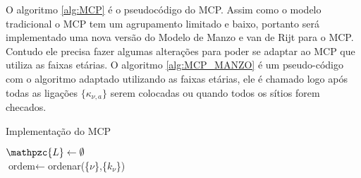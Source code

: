 O algoritmo \ref{alg:MCP} é o pseudocódigo do MCP. Assim como o modelo tradicional o MCP tem um agrupamento limitado e baixo, portanto será implementado uma nova versão do Modelo de 
Manzo e van de Rijt para o MCP. Contudo ele precisa fazer algumas alterações para poder se adaptar ao MCP que utiliza as faixas etárias. O algoritmo \ref{alg:MCP_MANZO} é um pseudo-código com o algoritmo adaptado utilizando as faixas etárias, ele é chamado logo após todas as ligações 
$\{\kappa_{\nu,a}\}$ serem colocadas ou quando todos os sítios forem checados.


\begin{algorithm}[H]
   \caption{Implementação do MCP}
   \label{alg:MCP}
   $\mathpzc{L} \gets \emptyset$\\
   $\text{ordem} \gets $ordenar(\{$\nu$\},\{$k_\nu$\}) 
\end{algorithm}

